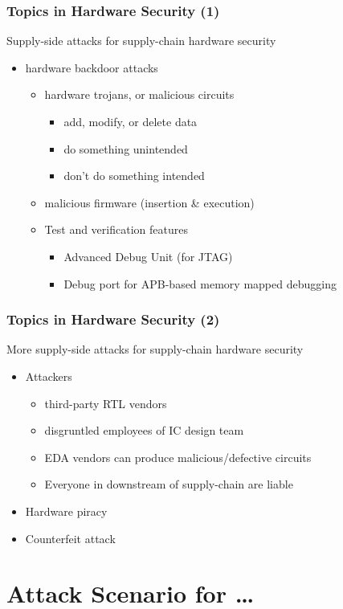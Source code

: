 \documentclass[xcolor={usenames,dvipsnames},hyperref={hyperindex,bookmarks}]{beamer}
\begin{document}
\frame
{
	\frametitle{Topics in Hardware Security (1)}

	Supply-side attacks for supply-chain hardware security \begin{itemize}
	\item hardware backdoor attacks
		\begin{itemize}
		\item hardware trojans, or malicious circuits
			\begin{itemize}
			\item add, modify, or delete data
			\item do something unintended
			\item don't do something intended
			\end{itemize}
		\item malicious firmware (insertion \& execution)
		\item Test and verification features
			\begin{itemize}
			\item Advanced Debug Unit (for JTAG)
			\item Debug port for APB-based memory mapped debugging
			\end{itemize}
		\end{itemize}
	\end{itemize}
}


\frame
{
	\frametitle{Topics in Hardware Security (2)}

	More supply-side attacks for supply-chain hardware security \begin{itemize}
	\item Attackers
		\begin{itemize}
		\item third-party RTL vendors
		\item disgruntled employees of IC design team
		\item EDA vendors can produce malicious/defective circuits
		\item Everyone in downstream of supply-chain are liable
		\end{itemize}
	\item Hardware piracy
	\item Counterfeit attack
	\end{itemize}
}




\section{Attack Scenario for \dots}
\end{document}
